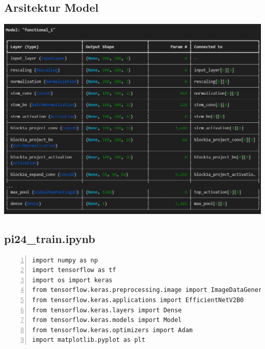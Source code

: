 \documentclass[12pt,oneside,bahasa]{book}
\begin{document}
\subsection*{Arsitektur Model}
\begin{center}
\includegraphics[width=14cm]{images/model_1}
\par\end{center}

\subsection*{pi24\_train.ipynb}

\begin{lstlisting}[numbers=left,basicstyle={\tiny},breaklines=true,showstringspaces=false,tabsize=5]
import numpy as np 
import tensorflow as tf 
import os import keras 
from tensorflow.keras.preprocessing.image import ImageDataGenerator, img_to_array, load_img 
from tensorflow.keras.applications import EfficientNetV2B0 
from tensorflow.keras.layers import Dense 
from tensorflow.keras.models import Model 
from tensorflow.keras.optimizers import Adam 
import matplotlib.pyplot as plt
\end{lstlisting}

\clearpage
{}
\end{document}

